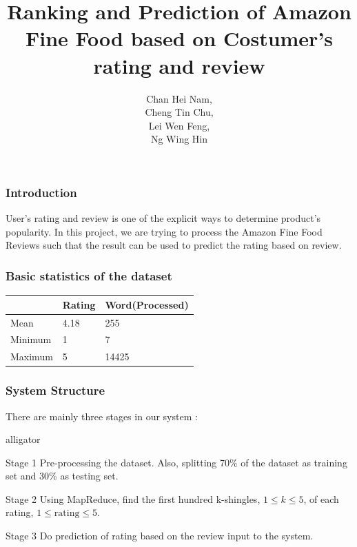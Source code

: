 \documentclass[11pt]{beamer}
\author{Chan Hei Nam, \\Cheng Tin Chu, \\Lei Wen Feng, \\Ng Wing Hin}
\title{Ranking and Prediction of Amazon Fine Food based on Costumer's rating and review}
\date{}
\begin{document}
\theoremstyle{plain}
\newtheorem{thm}{Theorem}[section] %

\theoremstyle{definition}
\newtheorem{defn}[thm]{Definition} %
\newtheorem{exmp}[thm]{Example} %
\newtheorem{prop}{Property}[section]

\graphicspath{ {images/} }

\begin{frame}
\titlepage
\end{frame}


\begin{frame}
\frametitle{Introduction}
User's rating and review is one of the explicit ways to determine product's popularity. In this project, we are trying to process the Amazon Fine Food Reviews such that the result can be used to predict the rating based on review.
\end{frame}

\begin{frame}
\frametitle{Basic statistics of the dataset}

\begin{tcolorbox}[colback=blue!5,colframe=blue!40!black,title=Basic statistics of the dataset]
\centering
\begin{tabular}{lll}
	\hline
	    					& Rating 	& Word(Processed)\\
	\hline
	Mean					& 4.18 		& 255\\
	Minimum       		& 1 			& 7\\
	Maximum       		& 5 			& 14425\\
	\hline
\end{tabular}
\end{tcolorbox}
\end{frame}


\begin{frame}
\frametitle{System Structure}
There are mainly three stages in our system :
\begin{labeling}{alligator}
\item [Stage 1] Pre-processing the dataset. Also, splitting 70\% of the dataset as training set and 30\% as testing set.
\item [Stage 2] Using MapReduce, find the first hundred k-shingles, \(1\leq k\leq 5\), of each rating, \(1 \leq \mbox{rating} \leq 5\).
\item [Stage 3] Do prediction of rating based on the review input to the system.
\end{labeling}
\end{frame}
\end{document}
